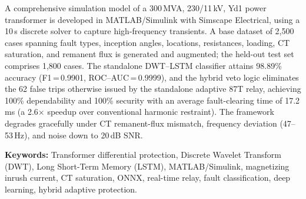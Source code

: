 \documentclass[12pt,a4paper,oneside]{report}
\begin{document}
A comprehensive simulation model of a 300\,MVA, 230/11\,kV, Yd1 power transformer is developed in MATLAB/Simulink with Simscape Electrical, using a 10\,\textmu s discrete solver to capture high-frequency transients. A base dataset of 2{,}500 cases spanning fault types, inception angles, locations, resistances, loading, CT saturation, and remanent flux is generated and augmented; the held-out test set comprises 1{,}800 cases. The standalone DWT--LSTM classifier attains 98.89\% accuracy (F1\,=\,0.9901, ROC--AUC\,=\,0.9999), and the hybrid veto logic eliminates the 62 false trips otherwise issued by the standalone adaptive 87T relay, achieving 100\% dependability and 100\% security with an average fault-clearing time of 17.2\,ms (a 2.6$\times$ speedup over conventional harmonic restraint). The framework degrades gracefully under CT remanent-flux mismatch, frequency deviation (47--53\,Hz), and noise down to 20\,dB SNR.

\vspace{4pt}\noindent\textbf{Keywords:} Transformer differential protection, Discrete Wavelet Transform (DWT), Long Short-Term Memory (LSTM), MATLAB/Simulink, magnetizing inrush current, CT saturation, ONNX, real-time relay, fault classification, deep learning, hybrid adaptive protection.
\end{document}
